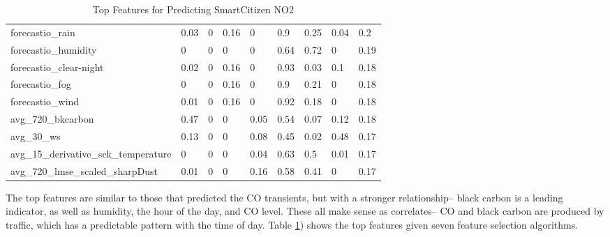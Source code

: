 \begin{table}[htb]
\begin{tabular}{lllllllll}
forecastio\_rain                           & 0.03  & 0          & 0.16 & 0    & 0.9   & 0.25      & 0.04 & 0.2  \\
forecastio\_humidity                       & 0     & 0          & 0    & 0    & 0.64  & 0.72      & 0    & 0.19 \\
forecastio\_clear-night                    & 0.02  & 0          & 0.16 & 0    & 0.93  & 0.03      & 0.1  & 0.18 \\
forecastio\_fog                            & 0     & 0          & 0.16 & 0    & 0.9   & 0.21      & 0    & 0.18 \\
forecastio\_wind                           & 0.01  & 0          & 0.16 & 0    & 0.92  & 0.18      & 0    & 0.18 \\
avg\_720\_bkcarbon                         & 0.47  & 0          & 0    & 0.05 & 0.54  & 0.07      & 0.12 & 0.18 \\
avg\_30\_ws                                & 0.13  & 0          & 0    & 0.08 & 0.45  & 0.02      & 0.48 & 0.17 \\
avg\_15\_derivative\_sck\_temperature      & 0     & 0          & 0    & 0.04 & 0.63  & 0.5       & 0.01 & 0.17 \\
avg\_720\_lmse\_scaled\_sharpDust          & 0.01  & 0          & 0    & 0.16 & 0.58  & 0.41      & 0    & 0.17 \\
\bottomrule
\end{tabular}
\label{tab:sck_no2_top_features}
\caption{Top Features for Predicting SmartCitizen NO2}
\end{table}

 
The top features are similar to those that predicted the CO transients, but with a stronger relationship-- black carbon is a leading indicator, as well as humidity, the hour of the day, and CO level.  These all make sense as correlates-- CO and black carbon are produced by traffic, which has a predictable pattern with the time of day.  Table \ref{tab:sck_no2_top_features}) shows the top features given seven feature selection algorithms.

\begin{margintable}
\centering
\offinterlineskip
\hspace*{-5cm}\raisebox{-4cm}[0pt][0pt]{}\par
\hspace{.3cm}\par
\vspace{-.5cm}
\hspace*{1cm}\par
{}
\vspace{-.35cm}\raisebox{-1cm}
}
\label{tab:sck_no2_confusion}
\caption{Average SmartCitizen NO2 Confusion Matrix w/Shuffled K-Fold}
\end{margintable}

